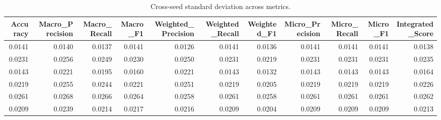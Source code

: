 \begin{table}[t]
\centering
\begin{tabular}{rrrrrrrrrrr}
\toprule
Accuracy & Macro_Precision & Macro_Recall & Macro_F1 & Weighted_Precision & Weighted_Recall & Weighted_F1 & Micro_Precision & Micro_Recall & Micro_F1 & Integrated_Score \\
\midrule
0.0141 & 0.0140 & 0.0137 & 0.0141 & 0.0126 & 0.0141 & 0.0136 & 0.0141 & 0.0141 & 0.0141 & 0.0138 \\
0.0231 & 0.0256 & 0.0249 & 0.0230 & 0.0250 & 0.0231 & 0.0219 & 0.0231 & 0.0231 & 0.0231 & 0.0235 \\
0.0143 & 0.0221 & 0.0195 & 0.0160 & 0.0221 & 0.0143 & 0.0132 & 0.0143 & 0.0143 & 0.0143 & 0.0164 \\
0.0219 & 0.0255 & 0.0244 & 0.0221 & 0.0251 & 0.0219 & 0.0205 & 0.0219 & 0.0219 & 0.0219 & 0.0226 \\
0.0261 & 0.0268 & 0.0266 & 0.0264 & 0.0258 & 0.0261 & 0.0258 & 0.0261 & 0.0261 & 0.0261 & 0.0262 \\
0.0209 & 0.0239 & 0.0214 & 0.0217 & 0.0216 & 0.0209 & 0.0204 & 0.0209 & 0.0209 & 0.0209 & 0.0213 \\
\bottomrule
\end{tabular}
\caption{Cross-seed standard deviation across metrics.}
\label{tab:cross_seed_std}
\end{table}